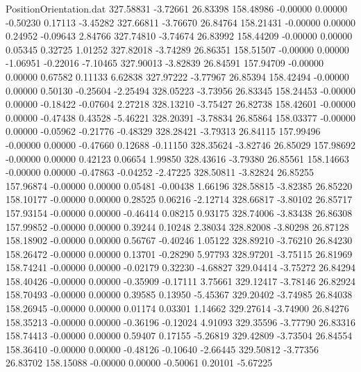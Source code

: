 \begin{filecontents}{PositionOrientation.dat}
 327.58831   -3.72661   26.83398   158.48986   -0.00000    0.00000   -0.50230    0.17113   -3.45282
 327.66811   -3.76670   26.84764   158.21431   -0.00000    0.00000    0.24952   -0.09643    2.84766
 327.74810   -3.74674   26.83992   158.44209   -0.00000    0.00000    0.05345    0.32725    1.01252
 327.82018   -3.74289   26.86351   158.51507   -0.00000    0.00000   -1.06951   -0.22016   -7.10465
 327.90013   -3.82839   26.84591   157.94709   -0.00000    0.00000    0.67582    0.11133    6.62838
 327.97222   -3.77967   26.85394   158.42494   -0.00000    0.00000    0.50130   -0.25604   -2.25494
 328.05223   -3.73956   26.83345   158.24453   -0.00000    0.00000   -0.18422   -0.07604    2.27218
 328.13210   -3.75427   26.82738   158.42601   -0.00000    0.00000   -0.47438    0.43528   -5.46221
 328.20391   -3.78834   26.85864   158.03377   -0.00000    0.00000   -0.05962   -0.21776   -0.48329
 328.28421   -3.79313   26.84115   157.99496   -0.00000    0.00000   -0.47660    0.12688   -0.11150
 328.35624   -3.82746   26.85029   157.98692   -0.00000    0.00000    0.42123    0.06654    1.99850
 328.43616   -3.79380   26.85561   158.14663   -0.00000    0.00000   -0.47863   -0.04252   -2.47225
 328.50811   -3.82824   26.85255   157.96874   -0.00000    0.00000    0.05481   -0.00438    1.66196
 328.58815   -3.82385   26.85220   158.10177   -0.00000    0.00000    0.28525    0.06216   -2.12714
 328.66817   -3.80102   26.85717   157.93154   -0.00000    0.00000   -0.46414    0.08215    0.93175
 328.74006   -3.83438   26.86308   157.99852   -0.00000    0.00000    0.39244    0.10248    2.38034
 328.82008   -3.80298   26.87128   158.18902   -0.00000    0.00000    0.56767   -0.40246    1.05122
 328.89210   -3.76210   26.84230   158.26472   -0.00000    0.00000    0.13701   -0.28290    5.97793
 328.97201   -3.75115   26.81969   158.74241   -0.00000    0.00000   -0.02179    0.32230   -4.68827
 329.04414   -3.75272   26.84294   158.40426   -0.00000    0.00000   -0.35909   -0.17111    3.75661
 329.12417   -3.78146   26.82924   158.70493   -0.00000    0.00000    0.39585    0.13950   -5.45367
 329.20402   -3.74985   26.84038   158.26945   -0.00000    0.00000    0.01174    0.03301    1.14662
 329.27614   -3.74900   26.84276   158.35213   -0.00000    0.00000   -0.36196   -0.12024    4.91093
 329.35596   -3.77790   26.83316   158.74413   -0.00000    0.00000    0.59407    0.17155   -5.26819
 329.42809   -3.73504   26.84554   158.36410   -0.00000    0.00000   -0.48126   -0.10640   -2.66445
 329.50812   -3.77356   26.83702   158.15088   -0.00000    0.00000   -0.50061    0.20101   -5.67225

\end{filecontents}
